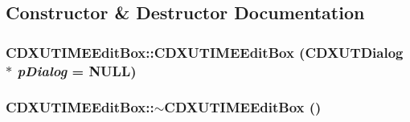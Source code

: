 \subsection{Constructor \& Destructor Documentation}
\hypertarget{class_c_d_x_u_t_i_m_e_edit_box_a4fe495517cf6a25bee93336af1e8a7c8}{
\subsubsection[{CDXUTIMEEditBox}]{\setlength{\rightskip}{0pt plus 5cm}CDXUTIMEEditBox::CDXUTIMEEditBox ({\bf CDXUTDialog} $\ast$ {\em pDialog} = {\ttfamily NULL})}}
\label{class_c_d_x_u_t_i_m_e_edit_box_a4fe495517cf6a25bee93336af1e8a7c8}
\hypertarget{class_c_d_x_u_t_i_m_e_edit_box_af7ff487e10a4aae66d61614dae5b08c0}{
\subsubsection[{$\sim$CDXUTIMEEditBox}]{\setlength{\rightskip}{0pt plus 5cm}CDXUTIMEEditBox::$\sim$CDXUTIMEEditBox ()}}
\label{class_c_d_x_u_t_i_m_e_edit_box_af7ff487e10a4aae66d61614dae5b08c0}


